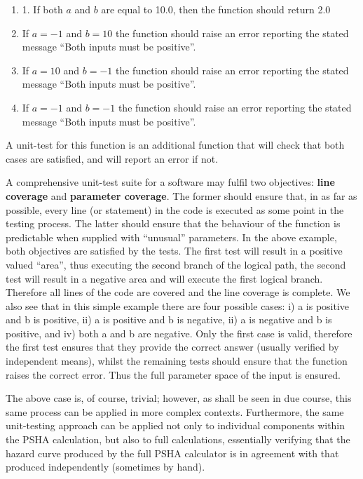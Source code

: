 \begin{enumerate}
\item 1. If both $a$ and $b$ are equal to 10.0, then the function should return 2.0

\item If $a = -1$ and $b = 10$ the function should raise an error reporting the stated message ``Both inputs must be positive''.

\item If $a = 10$ and $b = -1$ the function should raise an error reporting the stated message ``Both inputs must be positive''.

\item If $a = -1$ and $b = -1$ the function should raise an error reporting the stated message ``Both inputs must be positive''.
\end{enumerate}

A unit-test for this function is an additional function that will check that both cases are satisfied, and will report an error if not. 

A comprehensive unit-test suite for a software may fulfil two objectives: \textbf{line coverage} and \textbf{parameter coverage}. The former should ensure that, in as far as possible, every line (or statement) in the code is executed as some point in the testing process. The latter should ensure that the behaviour of the function is predictable when supplied with ``unusual'' parameters. In the above example, both objectives are satisfied by the tests. The first test will result in a positive valued ``area'', thus executing the second branch of the logical path, the second test will result in a negative area and will execute the first logical branch. Therefore all lines of the code are covered and the line coverage is complete. We also see that in this simple example there are four possible cases: i) a is positive and b is positive, ii) a is positive and b is negative,  ii) a is negative and b is positive, and iv) both a and b are negative. Only the first case is valid, therefore the first test ensures that they provide the correct answer (usually verified by independent means), whilst the remaining tests should ensure that the function raises the correct error. Thus the full parameter space of the input is ensured.

The above case is, of course, trivial; however, as shall be seen in due course, this same process can be applied in more complex contexts. Furthermore, the same unit-testing approach can be applied not only to individual components within the PSHA calculation, but also to full calculations, essentially verifying that the hazard curve produced by the full PSHA calculator is in agreement with that produced independently (sometimes by hand).


